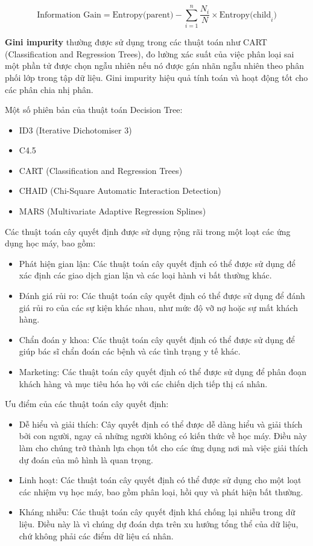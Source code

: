 \documentclass[a4paper]{article}
\begin{document}
\[ \text{Information Gain} = \text{Entropy(parent)} - \sum_{i=1}^{n} \frac{N_i}{N} \times \text{Entropy(child}_i) \]

\textbf{Gini impurity} thường được sử dụng trong các thuật toán như CART (Classification and Regression Trees), đo lường xác suất của việc phân loại sai một phần tử được chọn ngẫu nhiên nếu nó được gán nhãn ngẫu nhiên theo phân phối lớp trong tập dữ liệu. Gini impurity hiệu quả tính toán và hoạt động tốt cho các phân chia nhị phân.

Một số phiên bản của thuật toán Decision Tree\cite{geeksforgeeks_decision_tree_algorithms}:
\begin{itemize}
\item ID3 (Iterative Dichotomiser 3)
\item C4.5
\item CART (Classification and Regression Trees)
\item CHAID (Chi-Square Automatic Interaction Detection)
\item MARS (Multivariate Adaptive Regression Splines)
\end{itemize}
Các thuật toán cây quyết định được sử dụng rộng rãi trong một loạt các ứng dụng học máy, bao gồm:
\begin{itemize}
    \item Phát hiện gian lận: Các thuật toán cây quyết định có thể được sử dụng để xác định các giao dịch gian lận và các loại hành vi bất thường khác.
    \item Đánh giá rủi ro: Các thuật toán cây quyết định có thể được sử dụng để đánh giá rủi ro của các sự kiện khác nhau, như mức độ vỡ nợ hoặc sự mất khách hàng.
    \item Chẩn đoán y khoa: Các thuật toán cây quyết định có thể được sử dụng để giúp bác sĩ chẩn đoán các bệnh và các tình trạng y tế khác.
    \item Marketing: Các thuật toán cây quyết định có thể được sử dụng để phân đoạn khách hàng và mục tiêu hóa họ với các chiến dịch tiếp thị cá nhân.
\end{itemize}
Ưu điểm của các thuật toán cây quyết định:
\begin{itemize}
    \item Dễ hiểu và giải thích: Cây quyết định có thể được dễ dàng hiểu và giải thích bởi con người, ngay cả những người không có kiến thức về học máy. Điều này làm cho chúng trở thành lựa chọn tốt cho các ứng dụng nơi mà việc giải thích dự đoán của mô hình là quan trọng.
    \item Linh hoạt: Các thuật toán cây quyết định có thể được sử dụng cho một loạt các nhiệm vụ học máy, bao gồm phân loại, hồi quy và phát hiện bất thường.
    \item Kháng nhiễu: Các thuật toán cây quyết định khá chống lại nhiễu trong dữ liệu. Điều này là vì chúng dự đoán dựa trên xu hướng tổng thể của dữ liệu, chứ không phải các điểm dữ liệu cá nhân.
\end{itemize}
\end{document}
